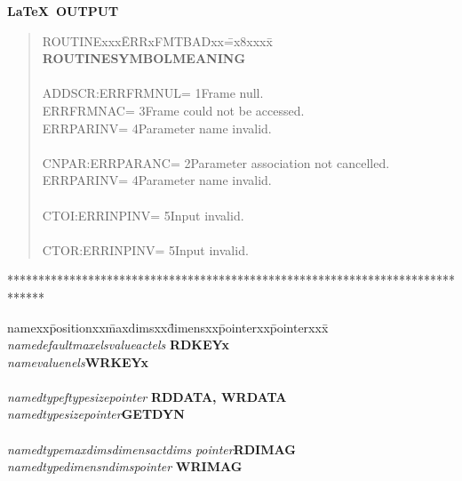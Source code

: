 \documentclass[twoside,11pt]{article}
\renewcommand{\_}{\texttt{\symbol{95}}}
\begin{document}
\newpage

\begin{center}
  \textbf{\LaTeX\ OUTPUT}
\end{center}

\begin{quote}
  \begin{tabbing}
    ROUTINExxx\=ERRxFMTBADxx\==x8xxxx\=\kill
    \textbf{ROUTINE}\>\textbf{SYMBOL}\>\>\textbf{MEANING}\\
    \\
    ADDSCR:\>ERR\_FRMNUL\>= 1\>Frame null.\\
    \>ERR\_FRMNAC\>= 3\>Frame could not be accessed.\\
    \>ERR\_PARINV\>= 4\>Parameter name invalid.\\
    \\
    CNPAR:\>ERR\_PARANC\>= 2\>Parameter association not cancelled.\\
    \>ERR\_PARINV\>= 4\>Parameter name invalid.\\
    \\
    CTOI:\>ERR\_INPINV\>= 5\>Input invalid.\\
    \\
    CTOR:\>ERR\_INPINV\>= 5\>Input invalid.\\
  \end{tabbing}
\end{quote}

******************************************************************************

\begin{tabbing}
  namexx\=positionxx\=maxdimsxx\=dimensxx\=pointerxx\=pointerxxx\=\kill
  \emph{name}\>\emph{default}\>\emph{maxels}\>\emph{value}\>\emph{actels}
    \>\>\textbf{RDKEYx}\\
  \emph{name}\>\>\>\emph{value}\>\emph{nels}\>\>\textbf{WRKEYx}\\
  \\
  \emph{name}\>\emph{dtype}\>\emph{ftype}\>\emph{size}\>\emph{pointer}
    \>\>\textbf{RDDATA, WRDATA}\\
  \emph{name}\>\emph{dtype}\>\>\emph{size}\>\emph{pointer}\>\>\textbf{GETDYN}\\
  \\
  \emph{name}\>\emph{dtype}\>\emph{maxdims}\>\emph{dimens}\>\emph{actdims}
    \>\emph{pointer}\>\textbf{RDIMAG}\\
  \emph{name}\>\emph{dtype}\>\>\emph{dimens}\>\emph{ndims}\>\emph{pointer}
    \>\textbf{WRIMAG}\\
\end{tabbing}
\end{document}
